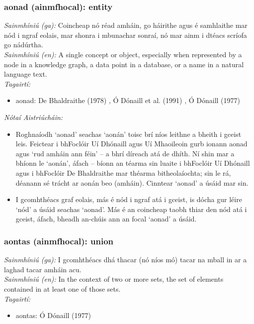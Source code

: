 \subsubsection*{aonad (ainmfhocal): entity}
 \noindent \textit{Sainmhíniú (ga):} Coincheap nó réad amháin, go háirithe agus é samhlaithe mar nód i ngraf eolais, mar shonra i mbunachar sonraí, nó mar ainm i dtéacs scríofa go nádúrtha.
\\
 \noindent \textit{Sainmhíniú (en):} A single concept or object, especially when represented by a node in a knowledge graph, a data point in a database, or a name in a natural language text.
\\
 \noindent \textit{Tagairtí:}
\begin{itemize}
	\item aonad: De Bhaldraithe (1978) \cite{de-bhaldraithe}, Ó Dónaill et al. (1991) \cite{focloir-beag}, Ó Dónaill (1977) \cite{odonaill}
\end{itemize}

 \noindent \textit{Nótaí Aistriúcháin:}
\begin{itemize}
	\item Roghnaíodh `aonad' seachas `aonán' toisc brí níos leithne a bheith i gceist leis. Feictear i bhFoclóir Uí Dhónaill agus Uí Mhaoileoin gurb ionann aonad agus `rud amháin ann féin' -- a bhrí díreach atá de dhíth. Ní shin mar a bhíonn le `aonán', áfach -- bíonn an téarma sin luaite i bhFoclóir Uí Dhónaill agus i bhFoclóir De Bhaldraithe mar théarma bitheolaíochta; sin le rá, déanann sé trácht ar aonán beo (amháin). Cinntear `aonad' a úsáid mar sin.
	\item I gcomhthéacs graf eolais, más é nód i ngraf atá i gceist, is dócha gur léire `nód' a úsáid seachas `aonad'. Más é an coincheap taobh thiar den nód atá i gceist, áfach, bheadh an-chúis ann an focal `aonad' a úsáid.
\end{itemize}


\subsubsection*{aontas (ainmfhocal): union}
 \noindent \textit{Sainmhíniú (ga):} I gcomhthéacs dhá thacar (nó níos mó) tacar na mball in ar a laghad tacar amháin acu.
\\
 \noindent \textit{Sainmhíniú (en):} In the context of two or more sets, the set of elements contained in at least one of those sets.
\\
 \noindent \textit{Tagairtí:}
\begin{itemize}
	\item aontas: Ó Dónaill (1977) \cite{odonaill}
\end{itemize}

